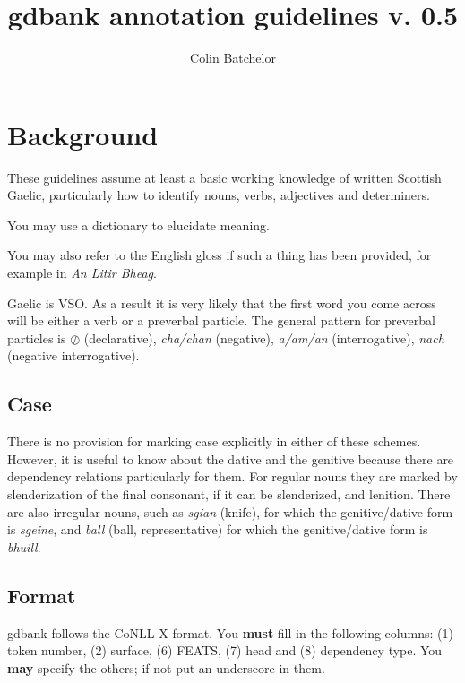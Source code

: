 \documentclass[a4paper]{article}
\begin{document}
\title{gdbank annotation guidelines v. 0.5}
\author{Colin Batchelor}
\maketitle

\section{Background}

These guidelines assume at least a basic working knowledge of written Scottish Gaelic, particularly how to identify nouns, verbs, adjectives and determiners.

 You may use a dictionary to elucidate meaning.

 You may also refer to the English gloss if such a thing has been provided, for example in {\it An Litir Bheag}.

 Gaelic is VSO. As a result it is very likely that the first word you come across will be either a verb or a preverbal particle.
The general pattern for preverbal particles is $\oslash$ (declarative), \textit{cha/chan} (negative), \textit{a/am/an} (interrogative), \textit{nach} (negative interrogative).





\subsection{Case}

There is no provision for marking case explicitly in either of these schemes.
However, it is useful to know about the dative and the genitive because there are dependency relations particularly for them.
For regular nouns they are marked by slenderization of the final consonant, if it can be slenderized, and lenition.
There are also irregular nouns, such as \textit{sgian} (knife), for which the genitive/dative form is \textit{sgeine}, and \textit{ball} (ball, representative) for which the genitive/dative form is \textit{bhuill}.

\subsection{Format}

 gdbank follows the CoNLL-X format.
You \textbf{must} fill in the following columns: (1) token number, (2) surface, (6) FEATS, (7) head and (8) dependency type.
You \textbf{may} specify the others; if not put an underscore in them.
\end{document}
